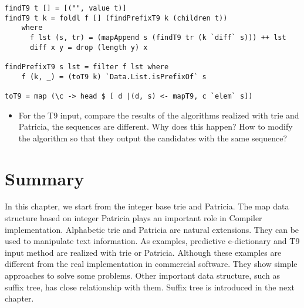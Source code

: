 \documentclass[UTF8]{article}
\begin{document}
\begin{lstlisting}
findT9 t [] = [("", value t)]
findT9 t k = foldl f [] (findPrefixT9 k (children t))
    where
      f lst (s, tr) = (mapAppend s (findT9 tr (k `diff` s))) ++ lst
      diff x y = drop (length y) x

findPrefixT9 s lst = filter f lst where
    f (k, _) = (toT9 k) `Data.List.isPrefixOf` s

toT9 = map (\c -> head $ [ d |(d, s) <- mapT9, c `elem` s])
\end{lstlisting}

\begin{Exercise}
\begin{itemize}
\item For the T9 input, compare the results of the algorithms realized with trie and Patricia,
the sequences are different. Why does this happen? How to modify the algorithm so that they
output the candidates with the same sequence?
\end{itemize}
\end{Exercise}

\section{Summary}

In this chapter, we start from the integer base trie and Patricia. The
map data structure based on integer Patricia plays an important role
in Compiler implementation. Alphabetic trie and Patricia are
natural extensions. They can be used to manipulate text information.
As examples, predictive e-dictionary and T9 input method are
realized with trie or Patricia. Although these examples
are different from the real implementation in commercial software.
They show simple approaches to solve some problems.
Other important data structure, such as suffix tree, has close
relationship with them. Suffix tree is introduced in the next chapter.
\end{document}
